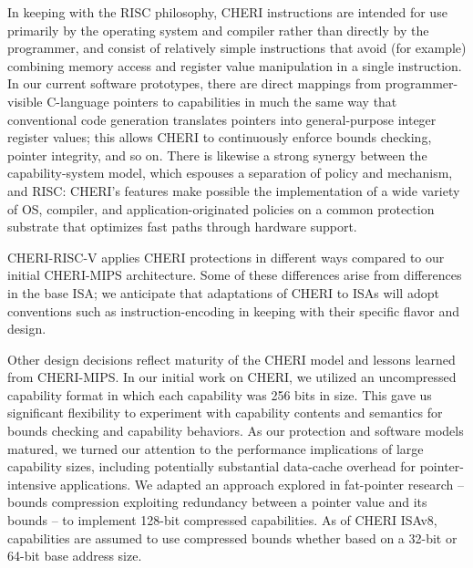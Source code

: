 In keeping with the RISC philosophy, CHERI instructions are intended for use
primarily
by the operating system and compiler rather than directly by the programmer, and consist of relatively simple instructions that avoid (for example) combining memory access and register value manipulation in a single instruction.
In our current software prototypes, there are direct mappings from programmer-visible C-language pointers to capabilities in much the same way that conventional code generation translates pointers into general-purpose integer register values; this allows CHERI to continuously enforce bounds checking, pointer integrity, and so on.
There is likewise a strong synergy between the capability-system
model, which espouses a separation of policy and mechanism, and RISC: CHERI's features make possible
the implementation of a wide variety of OS, compiler, and application-originated policies on a common protection substrate that optimizes fast paths through hardware support.

CHERI-RISC-V applies CHERI protections in different ways compared to
our initial CHERI-MIPS architecture.  Some of these differences arise
from differences in the base ISA; we anticipate that
adaptations of CHERI to ISAs will adopt
conventions such as instruction-encoding
in keeping with their specific flavor and design.

Other design decisions reflect maturity of the CHERI model and lessons
learned from CHERI-MIPS.
In our initial work on CHERI, we utilized an uncompressed capability format
in which each capability was 256 bits in size.
This gave us significant flexibility to experiment with capability contents
and semantics for bounds checking and capability behaviors.
As our protection and software models matured, we turned our attention to the
performance implications of large capability sizes, including potentially
substantial data-cache overhead for pointer-intensive applications.
We adapted an approach explored in fat-pointer research -- bounds compression
exploiting redundancy between a pointer value and its bounds -- to implement
128-bit compressed capabilities.
As of CHERI ISAv8, capabilities are assumed to use compressed bounds whether
based on a 32-bit or 64-bit base address size.

